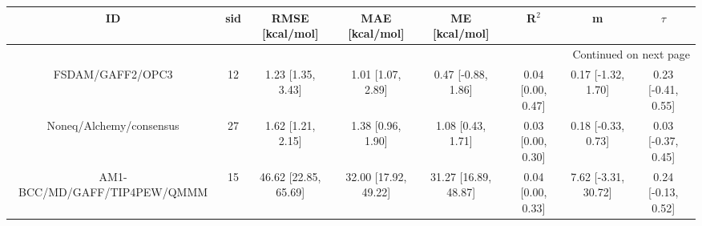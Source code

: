 \documentclass[8pt]{article}
\begin{document}
\begin{center}
\begin{footnotesize}
\begin{longtable}{|cccccccc|}
\toprule
                           ID & sid &       RMSE [kcal/mol] &        MAE [kcal/mol] &         ME [kcal/mol] &              R$^2$ &                    m &              $\tau$ \\
\midrule
\endhead
\midrule
\multicolumn{8}{r}{{Continued on next page}} \\
\midrule
\endfoot

\bottomrule
\endlastfoot
             FSDAM/GAFF2/OPC3 &  12 &     1.23 [1.35, 3.43] &     1.01 [1.07, 2.89] &    0.47 [-0.88, 1.86] &  0.04 [0.00, 0.47] &   0.17 [-1.32, 1.70] &  0.23 [-0.41, 0.55] \\
      Noneq/Alchemy/consensus &  27 &     1.62 [1.21, 2.15] &     1.38 [0.96, 1.90] &     1.08 [0.43, 1.71] &  0.03 [0.00, 0.30] &   0.18 [-0.33, 0.73] &  0.03 [-0.37, 0.45] \\
 AM1-BCC/MD/GAFF/TIP4PEW/QMMM &  15 &  46.62 [22.85, 65.69] &  32.00 [17.92, 49.22] &  31.27 [16.89, 48.87] &  0.04 [0.00, 0.33] &  7.62 [-3.31, 30.72] &  0.24 [-0.13, 0.52] \\
\end{longtable}
\end{footnotesize}
\end{center}
\end{document}
